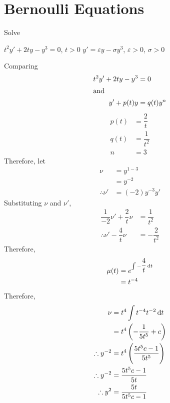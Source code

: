 \documentclass[fleqn, a4paper, 12pt, oneside]{amsart}
\theoremstyle{definition}
\theoremstyle{theorem}
\begin{document}
\part{Bernoulli Equations}

\begin{question}
	Solve
	\begin{tasks}
		\task $t^2 y' + 2 t y - y^3 = 0$, $t > 0$
		\task $y' = \varepsilon y - \sigma y^3$, $\varepsilon > 0$, $\sigma > 0$
	\end{tasks}
\end{question}

\begin{solution}
	\begin{tasks}
		\task
			Comparing
			\begin{align*}
				t^2 y' + 2 t y - y^3 &= 0\\
				\intertext{and}
				y' + p(t) y &= q(t) y^n
			\end{align*}
			\begin{align*}
				p(t) &= \dfrac{2}{t}\\
				q(t) &= \dfrac{1}{t^2}\\
				n &= 3
			\end{align*}
			Therefore, let
			\begin{align*}
				\nu &= y ^{1 - 3}\\
				&= y^{-2}\\
				\therefore \nu' &= (-2) y^{-3} y'
			\end{align*}
			Substituting $\nu$ and $\nu'$,
			\begin{align*}
				\dfrac{1}{-2} \nu' + \dfrac{2}{t} \nu &= \dfrac{1}{t^2}\\
				\therefore \nu' - \dfrac{4}{t} \nu &= -\dfrac{2}{t^2}
			\end{align*}
			Therefore,
			\begin{align*}
				\mu(t) &= e^{\int -\dfrac{4}{t} \dif t}\\
				&= t^{-4}
			\end{align*}
			Therefore,
			\begin{align*}
				\nu &= t^4 \int t^{-4} t^{-2} \dif t\\
				&= t^4 \left( -\dfrac{1}{5 t^5} + c \right)\\
				\therefore y^{-2} &= t^4 \left( \dfrac{5 t^5 c - 1}{5 t^5} \right)\\
				\therefore y^{-2} &= \dfrac{5t^5 c - 1}{5 t}\\
				\therefore y^2 &= \dfrac{5t}{5t^5 c - 1}\\

\end{align*}
\end{tasks}
\end{solution}
\end{document}

